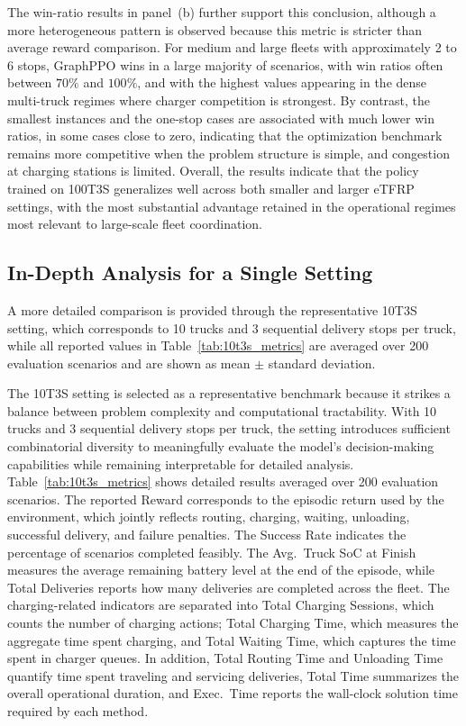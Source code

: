 \documentclass[a4paper,fleqn]{cas-sc}
\begin{document}
The win-ratio results in panel~(b) further support this conclusion, although a more heterogeneous pattern is observed because this metric is stricter than average reward comparison. For medium and large fleets with approximately 2 to 6 stops, GraphPPO wins in a large majority of scenarios, with win ratios often between $70\%$ and $100\%$, and with the highest values appearing in the dense multi-truck regimes where charger competition is strongest. By contrast, the smallest instances and the one-stop cases are associated with much lower win ratios, in some cases close to zero, indicating that the optimization benchmark remains more competitive when the problem structure is simple, and congestion at charging stations is limited. Overall, the results indicate that the policy trained on 100T3S generalizes well across both smaller and larger eTFRP settings, with the most substantial advantage retained in the operational regimes most relevant to large-scale fleet coordination.




\subsection{In-Depth Analysis for a Single Setting}

A more detailed comparison is provided through the representative 10T3S setting, which corresponds to 10 trucks and 3 sequential delivery stops per truck, while all reported values in Table~\ref{tab:10t3s_metrics} are averaged over 200 evaluation scenarios and are shown as mean $\pm$ standard deviation.

The 10T3S setting is selected as a representative benchmark because it strikes a balance between problem complexity and computational tractability. With 10 trucks and 3 sequential delivery stops per truck, the setting introduces sufficient combinatorial diversity to meaningfully evaluate the model's decision-making capabilities while remaining interpretable for detailed analysis.
Table~\ref{tab:10t3s_metrics} shows detailed results averaged over 200 evaluation scenarios.
The reported {Reward} corresponds to the episodic return used by the environment, which jointly reflects routing, charging, waiting, unloading, successful delivery, and failure penalties. The {Success Rate} indicates the percentage of scenarios completed feasibly. The {Avg.\ Truck SoC at Finish} measures the average remaining battery level at the end of the episode, while {Total Deliveries} reports how many deliveries are completed across the fleet. The charging-related indicators are separated into {Total Charging Sessions}, which counts the number of charging actions; {Total Charging Time}, which measures the aggregate time spent charging, and {Total Waiting Time}, which captures the time spent in charger queues. In addition, {Total Routing Time} and {Unloading Time} quantify time spent traveling and servicing deliveries, {Total Time} summarizes the overall operational duration, and Exec.\ Time reports the wall-clock solution time required by each method.
\end{document}
